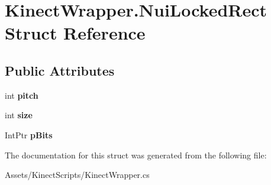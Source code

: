 \hypertarget{struct_kinect_wrapper_1_1_nui_locked_rect}{}\section{Kinect\+Wrapper.\+Nui\+Locked\+Rect Struct Reference}
\label{struct_kinect_wrapper_1_1_nui_locked_rect}
\subsection*{Public Attributes}
\begin{DoxyCompactItemize}
\item 
\mbox{\label{struct_kinect_wrapper_1_1_nui_locked_rect_a774555b91f90ec698409f3b6b02ec446}} 
int {\bfseries pitch}
\item 
\mbox{\label{struct_kinect_wrapper_1_1_nui_locked_rect_af9b113d7841ba06a110795fc37d600f0}} 
int {\bfseries size}
\item 
\mbox{\label{struct_kinect_wrapper_1_1_nui_locked_rect_a533926e413a6b88b40948bdcca58ba75}} 
Int\+Ptr {\bfseries p\+Bits}
\end{DoxyCompactItemize}


The documentation for this struct was generated from the following file\+:\begin{DoxyCompactItemize}
\item 
Assets/\+Kinect\+Scripts/Kinect\+Wrapper.\+cs\end{DoxyCompactItemize}
